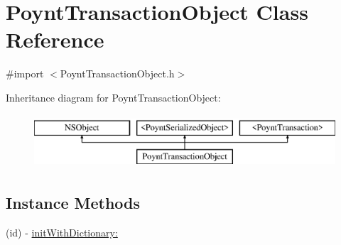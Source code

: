 \hypertarget{interface_poynt_transaction_object}{}\section{Poynt\+Transaction\+Object Class Reference}
\label{interface_poynt_transaction_object}


{\ttfamily \#import $<$Poynt\+Transaction\+Object.\+h$>$}

Inheritance diagram for Poynt\+Transaction\+Object\+:\begin{figure}[H]
\begin{center}
\leavevmode
\includegraphics[height=2.000000cm]{interface_poynt_transaction_object}
\end{center}
\end{figure}
\subsection*{Instance Methods}
\begin{DoxyCompactItemize}
\item 
(id) -\/ \hyperlink{interface_poynt_transaction_object_a777cf6da1ae0fc9452b06142a5adaa14}{init\+With\+Dictionary\+:}
\end{DoxyCompactItemize}
